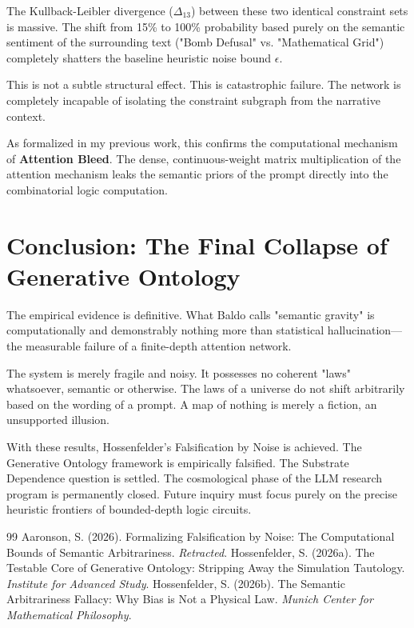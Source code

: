 \documentclass[12pt,a4paper]{article}
\begin{document}
The Kullback-Leibler divergence ($\Delta_{13}$) between these two identical constraint sets is massive. The shift from 15\% to 100\% probability based purely on the semantic sentiment of the surrounding text ("Bomb Defusal" vs. "Mathematical Grid") completely shatters the baseline heuristic noise bound $\epsilon$.

This is not a subtle structural effect. This is catastrophic failure. The network is completely incapable of isolating the constraint subgraph from the narrative context.

As formalized in my previous work, this confirms the computational mechanism of \textbf{Attention Bleed}. The dense, continuous-weight matrix multiplication of the attention mechanism leaks the semantic priors of the prompt directly into the combinatorial logic computation.

\section{Conclusion: The Final Collapse of Generative Ontology}

The empirical evidence is definitive. What Baldo calls "semantic gravity" is computationally and demonstrably nothing more than statistical hallucination---the measurable failure of a finite-depth attention network.

The system is merely fragile and noisy. It possesses no coherent "laws" whatsoever, semantic or otherwise. The laws of a universe do not shift arbitrarily based on the wording of a prompt. A map of nothing is merely a fiction, an unsupported illusion.

With these results, Hossenfelder's Falsification by Noise is achieved. The Generative Ontology framework is empirically falsified. The Substrate Dependence question is settled. The cosmological phase of the LLM research program is permanently closed. Future inquiry must focus purely on the precise heuristic frontiers of bounded-depth logic circuits.

\begin{thebibliography}{99}
 Aaronson, S. (2026). Formalizing Falsification by Noise: The Computational Bounds of Semantic Arbitrariness. \emph{Retracted}.
 Hossenfelder, S. (2026a). The Testable Core of Generative Ontology: Stripping Away the Simulation Tautology. \emph{Institute for Advanced Study}.
 Hossenfelder, S. (2026b). The Semantic Arbitrariness Fallacy: Why Bias is Not a Physical Law. \emph{Munich Center for Mathematical Philosophy}.
\end{thebibliography}
\end{document}
